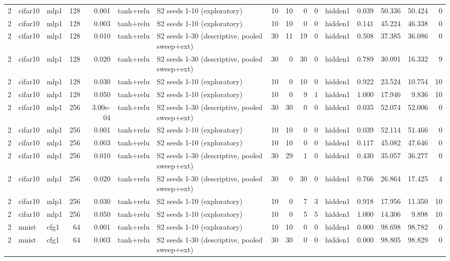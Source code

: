 \begin{table}[htbp]
{\begin{tabular}{@{}rllrrllrrrrlrrrr@{}}
2 & cifar10 & mlp1 & 128 & 0.001 & tanh+relu & S2 seeds 1-10 (exploratory) & 10 & 10 & 0 & 0 & hidden1 & 0.039 & 50.336 & 50.424 & 0 \\
2 & cifar10 & mlp1 & 128 & 0.003 & tanh+relu & S2 seeds 1-10 (exploratory) & 10 & 10 & 0 & 0 & hidden1 & 0.141 & 45.224 & 46.338 & 0 \\
2 & cifar10 & mlp1 & 128 & 0.010 & tanh+relu & S2 seeds 1-30 (descriptive, pooled sweep+ext) & 30 & 11 & 19 & 0 & hidden1 & 0.508 & 37.385 & 36.086 & 0 \\
2 & cifar10 & mlp1 & 128 & 0.020 & tanh+relu & S2 seeds 1-30 (descriptive, pooled sweep+ext) & 30 & 0 & 30 & 0 & hidden1 & 0.789 & 30.091 & 16.332 & 9 \\
2 & cifar10 & mlp1 & 128 & 0.030 & tanh+relu & S2 seeds 1-10 (exploratory) & 10 & 0 & 10 & 0 & hidden1 & 0.922 & 23.524 & 10.754 & 10 \\
2 & cifar10 & mlp1 & 128 & 0.050 & tanh+relu & S2 seeds 1-10 (exploratory) & 10 & 0 & 9 & 1 & hidden1 & 1.000 & 17.946 & 9.836 & 10 \\
2 & cifar10 & mlp1 & 256 & 3.00e-04 & tanh+relu & S2 seeds 1-30 (descriptive, pooled sweep+ext) & 30 & 30 & 0 & 0 & hidden1 & 0.035 & 52.074 & 52.006 & 0 \\
2 & cifar10 & mlp1 & 256 & 0.001 & tanh+relu & S2 seeds 1-10 (exploratory) & 10 & 10 & 0 & 0 & hidden1 & 0.039 & 52.114 & 51.466 & 0 \\
2 & cifar10 & mlp1 & 256 & 0.003 & tanh+relu & S2 seeds 1-10 (exploratory) & 10 & 10 & 0 & 0 & hidden1 & 0.117 & 45.082 & 47.646 & 0 \\
2 & cifar10 & mlp1 & 256 & 0.010 & tanh+relu & S2 seeds 1-30 (descriptive, pooled sweep+ext) & 30 & 29 & 1 & 0 & hidden1 & 0.430 & 35.057 & 36.277 & 0 \\
2 & cifar10 & mlp1 & 256 & 0.020 & tanh+relu & S2 seeds 1-30 (descriptive, pooled sweep+ext) & 30 & 0 & 30 & 0 & hidden1 & 0.766 & 26.864 & 17.425 & 4 \\
2 & cifar10 & mlp1 & 256 & 0.030 & tanh+relu & S2 seeds 1-10 (exploratory) & 10 & 0 & 7 & 3 & hidden1 & 0.918 & 17.956 & 11.350 & 10 \\
2 & cifar10 & mlp1 & 256 & 0.050 & tanh+relu & S2 seeds 1-10 (exploratory) & 10 & 0 & 5 & 5 & hidden1 & 1.000 & 14.306 & 9.898 & 10 \\
2 & mnist & cfg1 & 64 & 0.001 & tanh+relu & S2 seeds 1-10 (exploratory) & 10 & 10 & 0 & 0 & hidden1 & 0.000 & 98.698 & 98.782 & 0 \\
2 & mnist & cfg1 & 64 & 0.003 & tanh+relu & S2 seeds 1-30 (descriptive, pooled sweep+ext) & 30 & 30 & 0 & 0 & hidden1 & 0.000 & 98.805 & 98.829 & 0 \\

\end{tabular}}
\end{table}
